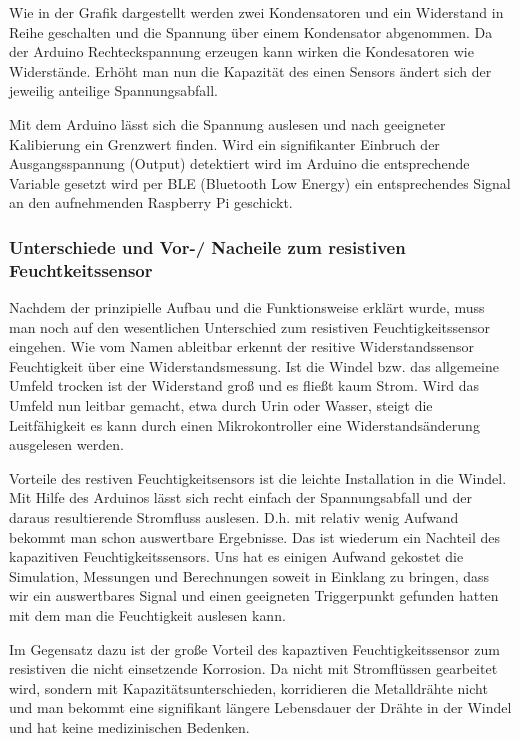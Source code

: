 Wie in der Grafik dargestellt werden zwei Kondensatoren und ein Widerstand in Reihe geschalten und die Spannung über einem Kondensator abgenommen. Da der Arduino Rechteckspannung erzeugen kann wirken die Kondesatoren wie Widerstände. Erhöht man nun die Kapazität des einen Sensors ändert sich der jeweilig anteilige Spannungsabfall.

Mit dem Arduino lässt sich die Spannung auslesen und nach geeigneter Kalibierung ein Grenzwert finden. Wird ein signifikanter Einbruch der Ausgangsspannung (Output) detektiert wird im Arduino die entsprechende Variable gesetzt wird per BLE (Bluetooth Low Energy) ein entsprechendes Signal an den aufnehmenden Raspberry Pi geschickt.

 
\subsubsection{Unterschiede und Vor-/ Nacheile zum resistiven Feuchtkeitssensor}
Nachdem der prinzipielle Aufbau und die Funktionsweise erklärt wurde, muss man noch auf den wesentlichen Unterschied zum resistiven Feuchtigkeitssensor eingehen. Wie vom Namen ableitbar erkennt der resitive Widerstandssensor Feuchtigkeit über eine Widerstandsmessung. Ist die Windel bzw. das allgemeine Umfeld trocken ist der Widerstand groß und es fließt kaum Strom. Wird das Umfeld nun leitbar gemacht, etwa durch Urin oder Wasser, steigt die Leitfähigkeit es kann durch einen Mikrokontroller eine Widerstandsänderung ausgelesen werden. 

Vorteile des restiven Feuchtigkeitsensors  ist die leichte Installation in die Windel. Mit Hilfe des Arduinos lässt sich recht einfach der Spannungsabfall und der daraus resultierende Stromfluss auslesen. D.h. mit relativ wenig Aufwand bekommt man schon auswertbare Ergebnisse. Das ist wiederum ein Nachteil des kapazitiven Feuchtigkeitssensors. Uns hat es einigen Aufwand gekostet die Simulation, Messungen und Berechnungen soweit in Einklang zu bringen, dass wir ein auswertbares Signal und einen geeigneten Triggerpunkt gefunden hatten mit dem man die Feuchtigkeit auslesen kann.

Im Gegensatz dazu ist der große Vorteil des kapaztiven Feuchtigkeitssensor zum resistiven die nicht einsetzende Korrosion. Da nicht mit Stromflüssen gearbeitet wird, sondern mit Kapazitätsunterschieden, korridieren die Metalldrähte nicht und man bekommt eine signifikant längere Lebensdauer der Drähte in der Windel und hat keine medizinischen Bedenken.
\pagebreak

